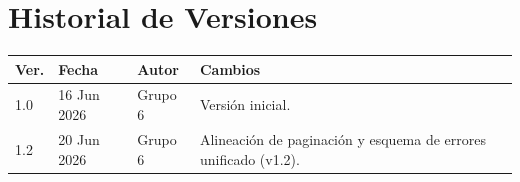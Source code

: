 \documentclass[11pt, a4paper]{article}
\begin{document}
\section{Historial de Versiones}

\begin{table}[h!]
\centering
\begin{tabularx}{\textwidth}{l l l X}
  \toprule
  \textbf{Ver.} & \textbf{Fecha} & \textbf{Autor} & \textbf{Cambios} \\
  \midrule
  1.0 & 16 Jun 2026 & Grupo 6 & Versión inicial. \\
  1.2 & 20 Jun 2026 & Grupo 6 & Alineación de paginación y esquema de errores unificado (v1.2). \\
  \bottomrule
\end{tabularx}
\end{table}
\end{document}
